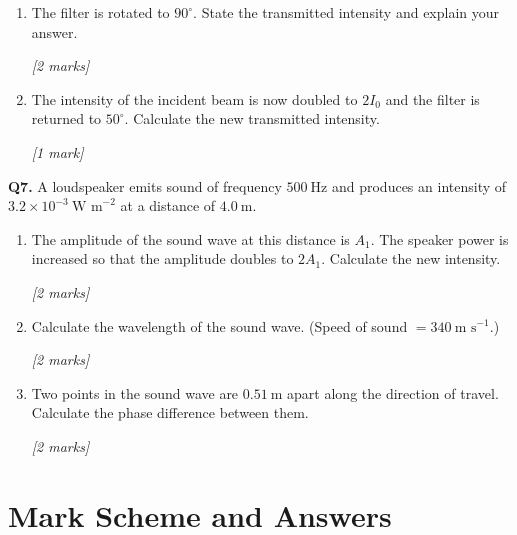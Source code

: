 \begin{tcolorbox}[colback=white, colframe=midblue, breakable]
\begin{minipage}{\linewidth}
\begin{enumerate}[label=(\alph*)]
  \item The filter is rotated to $90^\circ$. State the transmitted intensity and explain your answer.
  \par\hfill\textit{[2 marks]}
  \vspace{3cm}

  \item The intensity of the incident beam is now doubled to $2I_0$ and the filter is returned to $50^\circ$. Calculate the new transmitted intensity.
  \par\hfill\textit{[1 mark]}
  \vspace{2.5cm}
\end{enumerate}
\end{minipage}

\begin{minipage}{\linewidth}
\textbf{Q7.} A loudspeaker emits sound of frequency $500\ \text{Hz}$ and produces an intensity of $3.2\times10^{-3}\ \text{W m}^{-2}$ at a distance of $4.0\ \text{m}$.

\begin{enumerate}[label=(\alph*)]
  \item The amplitude of the sound wave at this distance is $A_1$. The speaker power is increased so that the amplitude doubles to $2A_1$. Calculate the new intensity.
  \par\hfill\textit{[2 marks]}
  \vspace{3cm}

  \item Calculate the wavelength of the sound wave. (Speed of sound $= 340\ \text{m s}^{-1}$.)
  \par\hfill\textit{[2 marks]}
  \vspace{2.5cm}

  \item Two points in the sound wave are $0.51\ \text{m}$ apart along the direction of travel. Calculate the phase difference between them.
  \par\hfill\textit{[2 marks]}
  \vspace{3cm}
\end{enumerate}
\end{minipage}

\end{tcolorbox}

\pagebreak


\section{Mark Scheme and Answers}

